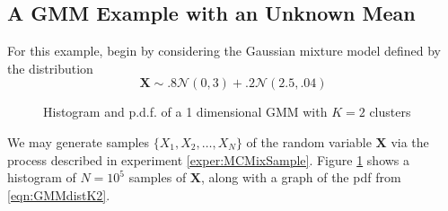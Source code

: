 %		
%		
%

\subsection{A GMM Example with an Unknown Mean}

For this example, begin by considering the Gaussian mixture model defined by the distribution
\begin{equation}\label{eqn:GMMdistK2}
\bm X \sim .8\mathcal{N}(0,3) +.2\mathcal{N}(2.5,.04)
\end{equation}

\begin{figure}[ht]
	\centering
	
	\caption[Example GMM Histogram]{Histogram and p.d.f. of a 1 dimensional GMM with \( K=2 \) clusters}\label{fig:gmmK2hist}
\end{figure}

We may generate samples \( \{X_1,X_2,\ldots,X_N\} \) of the random variable \(\bm X \) via the process described in experiment \ref{exper:MCMixSample}. Figure \ref{fig:gmmK2hist} shows a histogram of \( N=10^5 \) samples of \( \bm X \), along with a graph of the pdf from \ref{eqn:GMMdistK2}.

